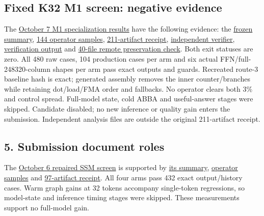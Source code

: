 \documentclass[10pt,a4paper]{article}
\begin{document}
\hypertarget{fixed-k32-m1-screen-negative-evidence}{%
\subsection{Fixed K32 M1 screen: negative
evidence}\label{fixed-k32-m1-screen-negative-evidence}}

The
\href{https://github.com/MoyaMryia/riscv-accl/blob/main/spacemit/reports/2026-10-07-ime-m1-k32-results.md}{October
7 M1 specialization results} have the following evidence: the
\href{https://github.com/MoyaMryia/riscv-accl/blob/main/spacemit/reports/raw/k1-ime-m1-k32-20261007-121231/summary.json}{frozen
summary},
\href{https://github.com/MoyaMryia/riscv-accl/blob/main/spacemit/reports/raw/k1-ime-m1-k32-20261007-121231/operator.jsonl}{144
operator samples},
\href{https://github.com/MoyaMryia/riscv-accl/blob/main/spacemit/reports/raw/k1-ime-m1-k32-20261007-121231/collection-receipt.json}{211-artifact
receipt},
\href{https://github.com/MoyaMryia/riscv-accl/blob/main/spacemit/reports/raw/k1-ime-m1-analysis-20261007/verify-completion.py}{independent
verifier},
\href{https://github.com/MoyaMryia/riscv-accl/blob/main/spacemit/reports/raw/k1-ime-m1-analysis-20261007/verification.json}{verification
output} and
\href{https://github.com/MoyaMryia/riscv-accl/blob/main/spacemit/reports/raw/k1-ime-m1-analysis-20261007/remote-preservation.json}{40-file
remote preservation check}. Both exit statuses are zero. All 480 raw
cases, 104 production cases per arm and six actual
FFN/full-248320-column shapes per arm pass exact outputs and guards.
Recreated route-3 baseline hash is exact; generated assembly removes the
inner counter/branches while retaining dot/load/FMA order and fallbacks.
No operator clears both 3\% and control spread. Full-model state, cold
ABBA and useful-answer stages were skipped. Candidate disabled; no new
inference or quality gain enters the submission. Independent analysis
files are outside the original 211-artifact receipt.

\hypertarget{submission-document-roles}{%
\subsection{5. Submission document
roles}\label{submission-document-roles}}

The
\href{https://github.com/MoyaMryia/riscv-accl/blob/main/spacemit/reports/2026-10-06-ssm-conv-repaired-results.md}{October
6 repaired SSM screen} is supported by
\href{https://github.com/MoyaMryia/riscv-accl/blob/main/spacemit/reports/raw/k1-ssm-conv-20261006-115459/summary.json}{its
summary},
\href{https://github.com/MoyaMryia/riscv-accl/blob/main/spacemit/reports/raw/k1-ssm-conv-20261006-115459/operator.jsonl}{operator
samples} and
\href{https://github.com/MoyaMryia/riscv-accl/blob/main/spacemit/reports/raw/k1-ssm-conv-20261006-115459/collection-receipt.json}{97-artifact
receipt}. All four arms pass 432 exact output/history cases. Warm graph
gains at 32 tokens accompany single-token regressions, so model-state
and inference timing stages were skipped. These measurements support no
full-model gain.
\end{document}
